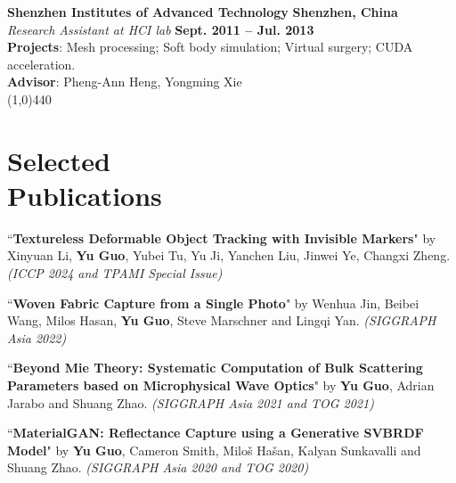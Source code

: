 \documentclass[margin,line]{resume}
\begin{document}
\begin{resume}
    \vspace{0.0mm}
    
    \textbf{Shenzhen Institutes of Advanced Technology}   \hfill \textbf{Shenzhen, China} \\
    \textsl{Research Assistant at HCI lab} \hfill \textbf{Sept. 2011 -- Jul. 2013} \\
    \textbf{Projects}: Mesh processing; Soft body simulation; Virtual surgery; CUDA acceleration. \\
    \textbf{Advisor}: Pheng-Ann Heng, Yongming Xie \\

	\vspace{-5.0mm}
	\line(1,0){440}
	\vspace{-5.0mm}
	
	\section{\mysidestyle Selected \\Publications}

	``\textbf{Textureless Deformable Object Tracking with Invisible Markers}" 
	by Xinyuan Li, \textbf{Yu Guo}, Yubei Tu, Yu Ji, Yanchen Liu, Jinwei Ye, Changxi Zheng.
	\textsl{(ICCP 2024 and TPAMI Special Issue)}\\
	
	\vspace{-5mm}
	
	``\textbf{Woven Fabric Capture from a Single Photo}" 
	by Wenhua Jin, Beibei Wang, Milos Hasan, \textbf{Yu Guo}, Steve Marschner and Lingqi Yan. 
	\textsl{(SIGGRAPH Asia 2022)}\\
	
	\vspace{-5mm}
	
	``\textbf{Beyond Mie Theory: Systematic Computation of Bulk Scattering Parameters based on Microphysical Wave Optics}" 
	by \textbf{Yu Guo}, Adrian Jarabo and Shuang Zhao. 
	\textsl{(SIGGRAPH Asia 2021 and TOG 2021)}\\
	
	\vspace{-5mm}
	
	``\textbf{MaterialGAN: Reflectance Capture using a Generative SVBRDF Model}" 
	by \textbf{Yu Guo}, Cameron Smith, Milo\v{s} Ha\v{s}an, Kalyan Sunkavalli and Shuang Zhao. 
	\textsl{(SIGGRAPH Asia 2020 and TOG 2020)}\\
	

\end{resume}
\end{document}
